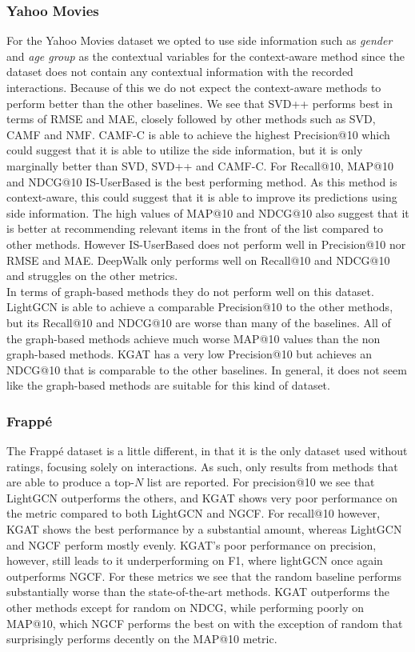 \subsubsection{Yahoo Movies}
For the Yahoo Movies dataset we opted to use side information such as \textit{gender} and \textit{age group} as the contextual variables for the context-aware method since the dataset does not contain any contextual information with the recorded interactions.
Because of this we do not expect the context-aware methods to perform better than the other baselines.
We see that SVD++ performs best in terms of RMSE and MAE, closely followed by other methods such as SVD, CAMF and NMF.
CAMF-C is able to achieve the highest Precision@10 which could suggest that it is able to utilize the side information, but it is only marginally better than SVD, SVD++ and CAMF-C.
For Recall@10, MAP@10 and NDCG@10 IS-UserBased is the best performing method.
As this method is context-aware, this could suggest that it is able to improve its predictions using side information.
The high values of MAP@10 and NDCG@10 also suggest that it is better at recommending relevant items in the front of the list compared to other methods.
However IS-UserBased does not perform well in Precision@10 nor RMSE and MAE.
DeepWalk only performs well on Recall@10 and NDCG@10 and struggles on the other metrics.
\\
In terms of graph-based methods they do not perform well on this dataset.
LightGCN is able to achieve a comparable Precision@10 to the other methods, but its Recall@10 and NDCG@10 are worse than many of the baselines.
All of the graph-based methods achieve much worse MAP@10 values than the non graph-based methods.
KGAT has a very low Precision@10 but achieves an NDCG@10 that is comparable to the other baselines.
In general, it does not seem like the graph-based methods are suitable for this kind of dataset.

\subsubsection{Frappé}
The Frappé dataset is a little different, in that it is the only dataset used without ratings, focusing solely on interactions.
As such, only results from methods that are able to produce a top-$N$ list are reported.
For precision@10 we see that LightGCN outperforms the others, and KGAT shows very poor performance on the metric compared to both LightGCN and NGCF.
For recall@10 however, KGAT shows the best performance by a substantial amount, whereas LightGCN and NGCF perform mostly evenly.
KGAT's poor performance on precision, however, still leads to it underperforming on F1, where lightGCN once again outperforms NGCF.
For these metrics we see that the random baseline performs substantially worse than the state-of-the-art methods.
KGAT outperforms the other methods except for random on NDCG, while performing poorly on MAP@10, which NGCF performs the best on with the exception of random that surprisingly performs decently on the MAP@10 metric.
